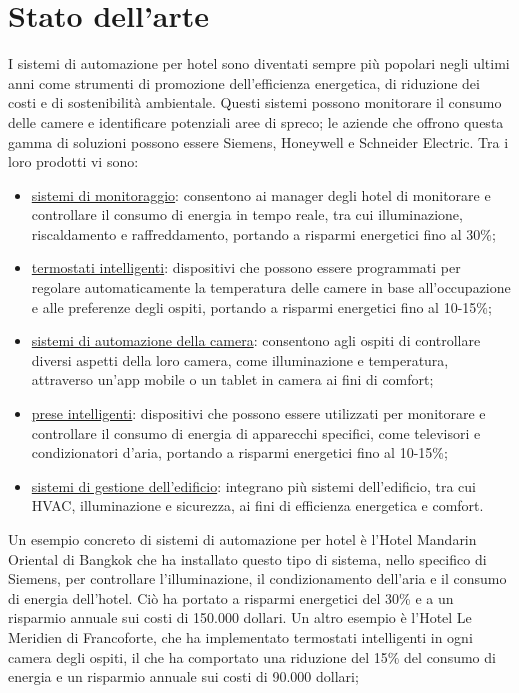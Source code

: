 
\section{Stato dell'arte}

I sistemi di automazione per hotel sono diventati sempre più popolari negli ultimi anni come strumenti di promozione dell'efficienza energetica, di riduzione dei costi e di sostenibilità ambientale. Questi sistemi possono monitorare il consumo delle camere e identificare potenziali aree di spreco; le aziende che offrono questa gamma di soluzioni possono essere Siemens, Honeywell e Schneider Electric. Tra i loro prodotti vi sono:

\begin{itemize}
    \item \underline{sistemi di monitoraggio}: consentono ai manager degli hotel di monitorare e controllare il consumo di energia in tempo reale, tra cui illuminazione, riscaldamento e raffreddamento, portando a risparmi energetici fino al 30\%;
    \item \underline{termostati intelligenti}: dispositivi che possono essere programmati per regolare automaticamente la temperatura delle camere in base all'occupazione e alle preferenze degli ospiti, portando a risparmi energetici fino al 10-15\%;
    \item \underline{sistemi di automazione della camera}: consentono agli ospiti di controllare diversi aspetti della loro camera, come illuminazione e temperatura, attraverso un'app mobile o un tablet in camera ai fini di comfort;
    \item \underline{prese intelligenti}: dispositivi che possono essere utilizzati per monitorare e controllare il consumo di energia di apparecchi specifici, come televisori e condizionatori d'aria, portando a risparmi energetici fino al 10-15\%;
    \item \underline{sistemi di gestione dell'edificio}: integrano più sistemi dell'edificio, tra cui HVAC, illuminazione e sicurezza, ai fini di efficienza energetica e comfort.
\end{itemize}

Un esempio concreto di sistemi di automazione per hotel è l'Hotel Mandarin Oriental di Bangkok che ha installato questo tipo di sistema, nello specifico di Siemens, per controllare l'illuminazione, il condizionamento dell'aria e il consumo di energia dell'hotel. Ciò ha portato a risparmi energetici del 30\% e a un risparmio annuale sui costi di 150.000 dollari. Un altro esempio è l'Hotel Le Meridien di Francoforte, che ha implementato termostati intelligenti in ogni camera degli ospiti, il che ha comportato una riduzione del 15\% del consumo di energia e un risparmio annuale sui costi di 90.000 dollari;

